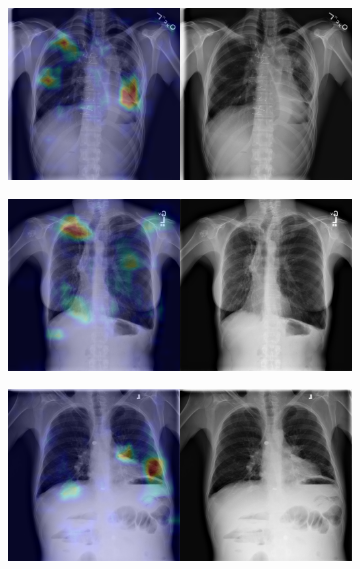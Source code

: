 \begin{figure}[b]
\begin{subfigure}{0.4\textwidth}
    \end{subfigure}
    \begin{subfigure}{0.4\textwidth}
        \centering
        \includegraphics[width=1.0\textwidth]{Chapters/5. Conclusiones/img/Fibrosis/1_1_00001170_049.png}
    \end{subfigure}
    \begin{subfigure}{0.4\textwidth}
        \centering
        \includegraphics[width=1.0\textwidth]{Chapters/5. Conclusiones/img/Fibrosis/1_1_00003089_002.png}
    \end{subfigure}
    \begin{subfigure}{0.4\textwidth}
        \centering
        \includegraphics[width=1.0\textwidth]{Chapters/5. Conclusiones/img/Fibrosis/1_1_00003996_011.png}

\end{subfigure}
\end{figure}

